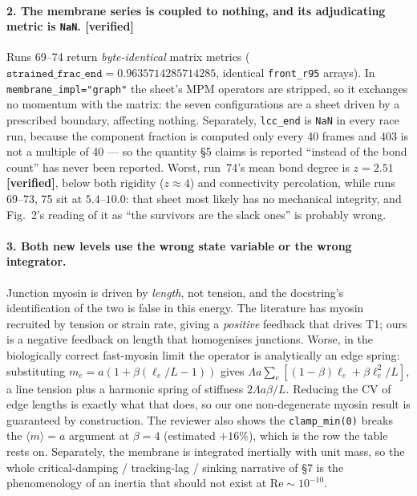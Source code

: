 \documentclass[10pt]{article}
\newcommand{\op}[1]{\texttt{#1}}
\begin{document}
\paragraph{2. The membrane series is coupled to nothing, and its adjudicating metric is \texttt{NaN}.
[verified]} Runs 69--74 return \emph{byte-identical} matrix metrics ($\texttt{strained\_frac\_end}
=0.9635714285714285$, identical \texttt{front\_r95} arrays). In \op{membrane\_impl="graph"} the sheet's
MPM operators are stripped, so it exchanges no momentum with the matrix: the seven configurations are a
sheet driven by a prescribed boundary, affecting nothing. Separately, \op{lcc\_end} is \texttt{NaN} in
every race run, because the component fraction is computed only every 40 frames and 403 is not a
multiple of 40 --- so the quantity \S5 claims is reported ``instead of the bond count'' has never been
reported. Worst, run~74's mean bond degree is $z=2.51$ \textbf{[verified]}, below both rigidity
($z\!\approx\!4$) and connectivity percolation, while runs 69--73, 75 sit at $5.4$--$10.0$: that sheet
most likely has no mechanical integrity, and Fig.~2's reading of it as ``the survivors are the slack
ones'' is probably wrong.

\paragraph{3. Both new levels use the wrong state variable or the wrong integrator.} Junction myosin is
driven by \emph{length}, not tension, and the docstring's identification of the two is false in this
energy. The literature has myosin recruited by tension or strain rate, giving a \emph{positive} feedback
that drives T1; ours is a negative feedback on length that homogenises junctions. Worse, in the
biologically correct fast-myosin limit the operator is analytically an edge spring: substituting
$m_e=a(1+\beta(\ell_e/L-1))$ gives $\Lambda a\sum_e[(1-\beta)\ell_e+\beta\ell_e^2/L]$, a line tension
plus a harmonic spring of stiffness $2\Lambda a\beta/L$. Reducing the CV of edge lengths is exactly what
that does, so our one non-degenerate myosin result is guaranteed by construction. The reviewer also
shows the \op{clamp\_min(0)} breaks the $\langle m\rangle=a$ argument at $\beta=4$ (estimated $+16\%$),
which is the row the table rests on. Separately, the membrane is integrated inertially with unit mass,
so the whole critical-damping / tracking-lag / sinking narrative of \S7 is the phenomenology of an
inertia that should not exist at $\mathrm{Re}\sim10^{-10}$.
\end{document}
